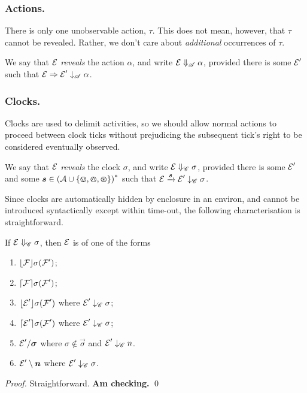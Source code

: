 \documentclass[orivec,envcountsame]{llncs}
\newcommand{\Exhibits}[1]{\mathrel{\downarrow_{#1}}}
\newcommand{\ExhibitsA}{\Exhibits{\mathscr{A}}}
\newcommand{\ExhibitsC}{\Exhibits{\mathscr{C}}}
\newcommand{\Reveals}[1]{\mathrel{\Downarrow_{#1}}}
\newcommand{\RevealsA}{\Reveals{\mathscr{A}}}
\newcommand{\RevealsC}{\Reveals{\mathscr{C}}}
\newcommand{\Does}[1]{\xderives{#1}}
\newcommand{\DoesTaus}{\mathrel{\Rightarrow}}
\begin{document}
\subsubsection{Actions.}

There is only one unobservable action, $\tau$. This does not mean, however, that $\tau$ cannot be revealed. Rather, we don't care about \emph{additional} occurrences of $\tau$.

\begin{definition}
We say that $\text{$\mathcal{E}$}$ \emph{reveals} the action $\alpha$, and write $\expr \RevealsA \alpha$, provided there is some $\text{$\mathcal{E}$}'$ such that $\expr \DoesTaus \expr' \ExhibitsA \alpha$.
\end{definition}

\subsubsection{Clocks.}

Clocks are used to delimit activities, so we should allow normal actions to proceed between clock ticks without prejudicing the subsequent tick's right to be considered eventually observed.

\begin{definition}
We say that $\text{$\mathcal{E}$}$ \emph{reveals} the clock $\sigma$, and write $\expr \RevealsC \sigma$, provided there is some $\text{$\mathcal{E}$}'$ and some $\vec{s} \in \left( \act \cup \{ \tin, \tout, \topen \}\right)^*$ such that $\expr \Does{\vec{s}} \expr' \ExhibitsC \sigma$.
\end{definition}

Since clocks are automatically hidden by enclosure in an environ, and cannot be introduced syntactically except within time-out, the following characterisation is straightforward.

\begin{proposition}
If $\expr \RevealsC \sigma$, then $\text{$\mathcal{E}$}$ is of one of the forms
\begin{enumerate}
\item
    $\lfloor{\text{$\mathcal{F}$}}\rfloor {\sigma} ({\text{$\mathcal{F}$}'})$;
\item
    $\lceil{\text{$\mathcal{F}$}}\rceil {\sigma} ({\text{$\mathcal{F}$}'})$;
\item
    $\lfloor{\text{$\mathcal{E}$}'}\rfloor {\sigma} ({\text{$\mathcal{F}$}'})$ where $\expr' \ExhibitsC \sigma$;
\item
    $\lceil{\text{$\mathcal{E}$}'}\rceil {\sigma} ({\text{$\mathcal{F}$}'})$ where $\expr' \ExhibitsC \sigma$;
\item
    $\expr' \hide{\vec{\sigma}}$ where $\sigma \not\in \vec{\sigma}$ and $\expr' \ExhibitsC n$.
\item
    $\expr' \res{ \vec{n} }$ where $\expr' \ExhibitsC \sigma$.
\end{enumerate}
\end{proposition}
\begin{proof}
Straightforward. \textbf{Am checking.}
\qed \end{proof}
\end{document}
